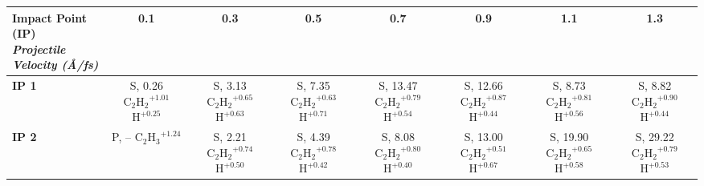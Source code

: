 \begin{table}[t]
\centering
\renewcommand{\arraystretch}{1.2}
\setcellgapes{2pt}\makegapedcells
\begin{tabular}{lccccccc}
\toprule
\makecell{\textbf{Impact Point (IP)}\\\textit{Projectile Velocity (\AA/fs)}} &
\textbf{0.1} & \textbf{0.3} & \textbf{0.5} & \textbf{0.7} & \textbf{0.9} & \textbf{1.1} & \textbf{1.3} \\
\midrule
\arrayrulecolor[gray]{0.75}
\textbf{IP 1} & \makecell{S, 0.26 \\ $\mathrm{C_2H_2}^{+1.01}$ \\ $\mathrm{H}^{+0.25}$} & 
\makecell{S, 3.13 \\ $\mathrm{C_2H_2}^{+0.65}$ \\ $\mathrm{H}^{+0.63}$} &
\makecell{S, 7.35 \\ $\mathrm{C_2H_2}^{+0.63}$ \\ $\mathrm{H}^{+0.71}$} &
\makecell{S, 13.47 \\ $\mathrm{C_2H_2}^{+0.79}$ \\ $\mathrm{H}^{+0.54}$} &
\makecell{S, 12.66 \\ $\mathrm{C_2H_2}^{+0.87}$ \\ $\mathrm{H}^{+0.44}$} &
\makecell{S, 8.73 \\ $\mathrm{C_2H_2}^{+0.81}$ \\ $\mathrm{H}^{+0.56}$} &
\makecell{S, 8.82 \\ $\mathrm{C_2H_2}^{+0.90}$ \\ $\mathrm{H}^{+0.44}$} \\
\midrule
\textbf{IP 2} & \makecell{P, -- \\ $\mathrm{C_2H_3}^{+1.24}$} &
\makecell{S, 2.21 \\ $\mathrm{C_2H_2}^{+0.74}$ \\ $\mathrm{H}^{+0.50}$} &
\makecell{S, 4.39 \\ $\mathrm{C_2H_2}^{+0.78}$ \\ $\mathrm{H}^{+0.42}$} &
\makecell{S, 8.08 \\ $\mathrm{C_2H_2}^{+0.80}$ \\ $\mathrm{H}^{+0.40}$} &
\makecell{S, 13.00 \\ $\mathrm{C_2H_2}^{+0.51}$ \\ $\mathrm{H}^{+0.67}$} &
\makecell{S, 19.90 \\ $\mathrm{C_2H_2}^{+0.65}$ \\ $\mathrm{H}^{+0.58}$} &
\makecell{S, 29.22 \\ $\mathrm{C_2H_2}^{+0.79}$ \\ $\mathrm{H}^{+0.53}$} \\

\end{tabular}
\end{table}
